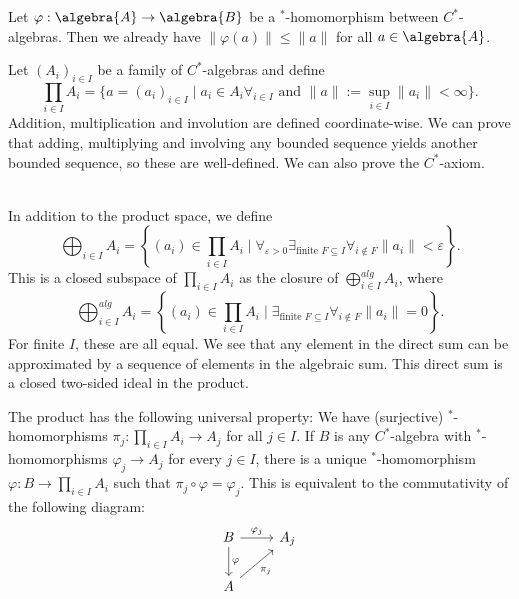 \documentclass[a4paper]{article}
\let\oldepsilon\epsilon
\let\epsilon\varepsilon
\let\varepsilon\oldepsilon
\let\oldphi\phi
\let\phi\varphi
\let\varphi\oldphi
\begin{document}
\begin{theorem}
	Let $\phi: \algebra{A} \to \algebra{B}$ be a $^*$-homomorphism between $C^*$-algebras. Then we already have $\|\phi(a)\| \leq \|a\|$ for all $a \in \algebra{A}$.
\end{theorem}

\begin{exercise}[4 - Products]
	Let $(A_i)_{i \in I}$ be a family of $C^*$-algebras and define
	\begin{equation*}
		\prod_{i \in I} A_i = \{a = (a_i)_{i \in I} \mid a_i \in A_i \forall_{i \in I} \text{ and } \|a\| := \sup_{i \in I} \|a_i\| < \infty \}\text{.}
	\end{equation*}
	Addition, multiplication and involution are defined coordinate-wise. We can prove that adding, multiplying and involving any bounded sequence yields another bounded sequence, so these are well-defined. We can also prove the $C^*$-axiom.
\end{exercise}

\begin{remark}~\\
	In addition to the product space, we define
	\begin{equation*}
		\bigoplus_{i \in I} A_i = \left\{(a_i) \in \prod_{i \in I} A_i \mid \forall_{\epsilon > 0} \exists_{\text{finite }F \subseteq I} \forall_{i \notin F} \|a_i\| < \epsilon\right\}\text{.}
	\end{equation*}
	This is a closed subspace of $\prod_{i \in I} A_i$ as the closure of $\bigoplus_{i \in I}^{alg} A_i$, where
	\begin{equation*}
		\bigoplus_{i \in I}^{alg} A_i = \left\{(a_i) \in \prod_{i \in I} A_i \mid \exists_{\text{finite }F \subseteq I} \forall_{i \notin F} \|a_i\| = 0\right\}\text{.}
	\end{equation*}
	For finite $I$, these are all equal. We see that any element in the direct sum can be approximated by a sequence of elements in the algebraic sum. This direct sum is a closed two-sided ideal in the product.

	The product has the following universal property:
	We have (surjective) $^*$-homomorphisms $\pi_j:  \prod_{i \in I} A_i \to A_j$ for all $j \in I$.
	If $B$ is any $C^*$-algebra with $^*$-homomorphisms $\phi_j \to A_j$ for every $j \in I$, there is a unique $^*$-homomorphism $\phi: B \to \prod_{i \in I} A_i$ such that  $\pi_j \circ \phi = \phi_j$.
	This is equivalent to the commutativity of the following diagram:
	\begin{equation*}
		\begin{tikzcd}
			B \arrow{r}{\phi_j} \arrow{d}{\phi} & A_j\\
			A  \arrow[swap]{ur}{\pi_j}
		\end{tikzcd}
	\end{equation*}
\end{remark}
\end{document}
